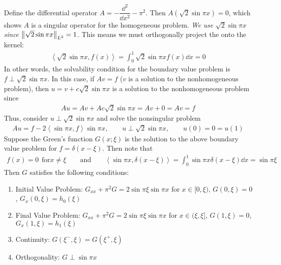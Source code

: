 \documentclass{article} %
\theoremstyle{plain}
\newcommand{\VEC}[2]{\left\langle #1, #2 \right\rangle}
\begin{document}
Define the differential operator $A = -\dfrac{\dd^2}{\dd x^2} - \pi^2$.  Then $A(\sqrt{2}\sin \pi x) = 0$, which shows $A$ is a singular operator for the homogeneous problem.  \emph{We use $\sqrt{2}\sin \pi x$ since $\norm{\sqrt{2}\sin\pi x}_{L^2} = 1$.}  This means we must orthogonally project the onto the kernel:
\begin{align*}
    \VEC{\sqrt{2}\sin\pi x}{f(x)} = \int_0^1 \sqrt{2}\sin\pi x f(x) \dd x = 0
\end{align*}
In other words, the solvability condition for the boundary value problem is $f \perp \sqrt{2}\sin \pi x$.  In this case, if $Av = f$ ($v$ is a solution to the nonhomogeneous problem), then $u = v + c\sqrt{2}\sin\pi x$ is a solution to the nonhomogeneous problem since
\begin{align*}
    Au = Av + Ac\sqrt{2}\sin \pi x = Av + 0 = Av = f
\end{align*}
Thus, consider $u \perp \sqrt{2}\sin \pi x$ and solve the nonsingular problem
\begin{align*}
    Au = f - 2\VEC{\sin\pi x}{f}\sin\pi x, \qquad u \perp \sqrt{2}\sin\pi x, \qquad u(0) = 0 = u(1)
\end{align*}
Suppose the Green's function $G(x;\xi)$ is the solution to the above boundary value problem for $f = \delta(x - \xi)$.  Then note that
\begin{align*}
    f(x) = 0\ \ \text{for} x \neq \xi \qquad \text{and} \qquad \VEC{\sin\pi x}{\delta(x-\xi)} = \int_0^1 \sin \pi x \delta(x - \xi)\dd x = \sin \pi \xi
\end{align*}
Then $G$ satisfies the following conditions:
\begin{enumerate}
    \item Initial Value Problem: $G_{xx} + \pi^2 G = 2\sin\pi\xi\sin\pi x$ for $x \in [0,\xi)$, $G(0,\xi) = 0$, $G_x(0, \xi) = h_0(\xi)$
    \item Final Value Problem: $G_{xx} + \pi^2 G = 2\sin\pi\xi\sin\pi x$ for $x \in (\xi,\xi]$, $G(1,\xi) = 0$, $G_x(1, \xi) = h_1(\xi)$
    \item Continuity: $G(\xi^-, \xi) = G(\xi^+, \xi)$
    \item Orthogonality: $G \perp \sin \pi x$
\end{enumerate}
\end{document}
